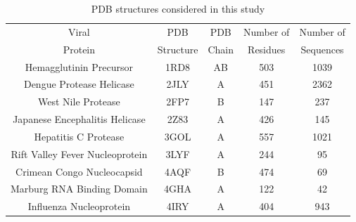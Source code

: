 \documentclass[12pt]{article}
\begin{document}
\begin{table}[htbp]
\begin{center}
\caption{PDB structures considered in this study \label{tab:pdb_names}}
\begin{tabular}{c c c c c} %
                        \hline
                        \hline
  Viral   & PDB     & PDB      & Number of  & Number of   \\ 
  Protein   & Structure  & Chain     & Residues    & Sequences   \\                                                           
  Hemagglutinin Precursor         & 1RD8           & AB        & 503                & 1039        \\ %
  Dengue Protease Helicase        & 2JLY           & A         & 451                & 2362        \\ %
  West Nile Protease              & 2FP7           & B         & 147                & 237         \\ %
  Japanese Encephalitis Helicase  & 2Z83           & A         & 426                & 145         \\ %
  Hepatitis C Protease            & 3GOL           & A         & 557                & 1021        \\ %
  Rift Valley Fever Nucleoprotein & 3LYF           & A         & 244                & 95          \\ %
  Crimean Congo Nucleocapsid      & 4AQF           & B         & 474                & 69          \\ %
  Marburg RNA Binding Domain      & 4GHA           & A         & 122                & 42          \\ %
  Influenza Nucleoprotein         & 4IRY           & A         & 404                & 943         \\ %
  \hline
  \hline
\end{tabular}
\end{center}
\end{table}
\end{document}
